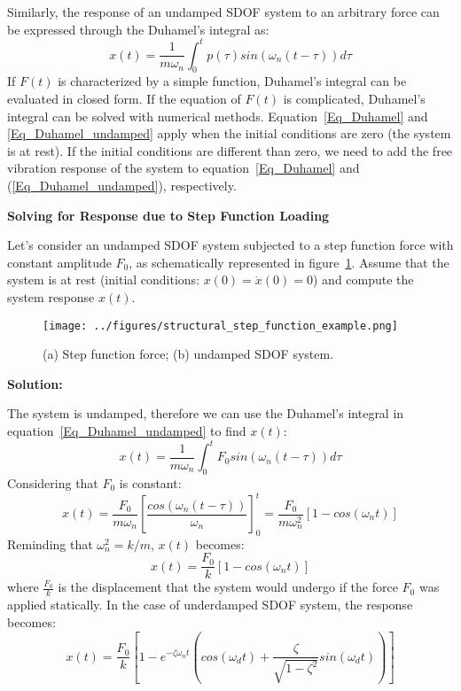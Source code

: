\documentclass[12pt,letter]{article}
\begin{document}
Similarly, the response of an undamped SDOF system to an arbitrary force can be expressed through the Duhamel's integral as:
\begin{equation} \label{Eq_Duhamel_undamped}
x(t) = \frac{1}{m \omega_n} \int_{0}^{t} p(\tau) sin(\omega_n (t - \tau)) d\tau
\end{equation}
If $F(t)$ is characterized by a simple function, Duhamel's integral can be evaluated in closed form. If the equation of $F(t)$ is complicated, Duhamel's integral can be solved with numerical methods. Equation~\ref{Eq_Duhamel} and \ref{Eq_Duhamel_undamped} apply when the initial conditions are zero (the system is at rest). If the initial conditions are different than zero, we need to add the free vibration response of the system to equation~\ref{Eq_Duhamel} and (\ref{Eq_Duhamel_undamped}), respectively. 



\pagebreak

\begin{example}
\textbf{Solving for Response due to Step Function Loading} 
	
\noindent
	
	Let's consider an undamped SDOF system subjected to a step function force with constant amplitude $F_0$, as schematically represented in figure~\ref{fig:step_force}. Assume that the system is at rest (initial conditions: $x(0) = \dot{x}(0) = 0$) and compute the system response $x(t)$. 
	
	\begin{figure}[H]
		\centering
		\texttt{[image: ../figures/structural\_step\_function\_example.png]}
		\caption{(a) Step function force; (b) undamped SDOF system.}
		\label{fig:step_force}
	\end{figure} 

\noindent \textbf{Solution:} 
	
\noindent The system is undamped, therefore we can use the Duhamel's integral in equation~\ref{Eq_Duhamel_undamped} to find $x(t)$:
\begin{equation} 
x(t) = \frac{1}{m \omega_n} \int_{0}^{t} F_0 sin(\omega_n (t - \tau)) d\tau 
\end{equation}
Considering that $F_0$ is constant:
\begin{equation}
x(t) = \frac{F_0}{m \omega_n} \left [\frac{cos(\omega_n (t - \tau))}{\omega_n} \right ]_{0}^t = \frac{F_0}{m \omega_n^2} [1 - cos(\omega_n t)]
\end{equation}
Reminding that $\omega_n^2 = k/m$, $x(t)$ becomes:
\begin{equation}
x(t) = \frac{F_0}{k} [1 - cos(\omega_n t)]
\end{equation}
where $\frac{F_0}{k}$ is the displacement that the system would undergo if the force $F_0$ was applied statically.
In the case of underdamped SDOF system, the response becomes:
\begin{equation} 
x(t) = \frac{F_0}{k} \left [1 - e^{-\zeta \omega_n t} \left (cos(\omega_d t) + \frac{\zeta}{\sqrt{1 - \zeta^2}} sin(\omega_d t)\right) \right]
\end{equation}

\end{example}
\end{document}
